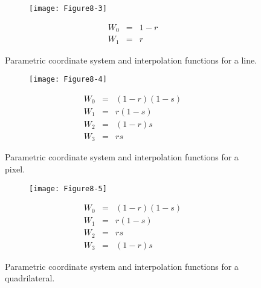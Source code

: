 \begin{figure}[!htb]
	\centering
	\begin{subfigure}{0.48\linewidth}
		\centering
		\texttt{[image: Figure8-3]}
		\caption*{}
	\end{subfigure}
	\hfill
	\begin{subfigure}{0.48\linewidth}
		\centering
		\begin{equation*}
		\begin{array}{lll}
			W_0 &=& 1-r \\
			W_1 &=& r		
		\end{array}
		\end{equation*}
	\end{subfigure}%
	\caption{Parametric coordinate system and interpolation functions for a line.}
	\label{fig:Figure8-3}
\end{figure}

\begin{figure}[!htb]
	\centering
	\begin{subfigure}{0.48\linewidth}
		\centering
		\texttt{[image: Figure8-4]}
		\caption*{}
	\end{subfigure}
	\hfill
	\begin{subfigure}{0.48\linewidth}
		\centering
		\begin{equation*}
		\begin{array}{lll}
		W_0 &=& (1-r)(1 - s) \\
		W_1 &=& r(1 - s) \\
		W_2 &=& (1 - r)s \\
		W_3 &=& r s		
		\end{array}
		\end{equation*}
	\end{subfigure}%
	\caption{Parametric coordinate system and interpolation functions for a pixel.}
	\label{fig:Figure8-4}
\end{figure}

\begin{figure}[!htb]
	\centering
	\begin{subfigure}{0.48\linewidth}
		\centering
		\texttt{[image: Figure8-5]}
		\caption*{}
	\end{subfigure}
	\hfill
	\begin{subfigure}{0.48\linewidth}
		\centering
		\begin{equation*}
		\begin{array}{lll}
		W_0 &=& (1-r)(1 - s) \\
		W_1 &=& r(1 - s) \\
		W_2 &=& r s \\
		W_3 &=& (1 - r)s	
		\end{array}
		\end{equation*}
	\end{subfigure}%
	\caption{Parametric coordinate system and interpolation functions for a quadrilateral.}
	\label{fig:Figure8-5}
\end{figure}

